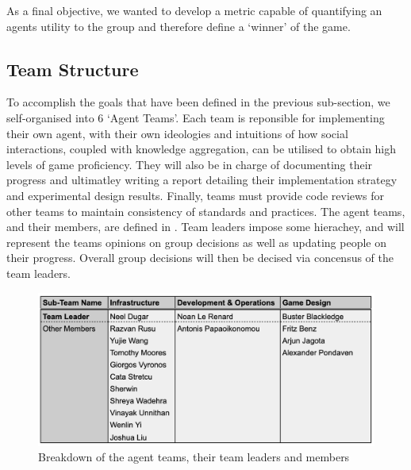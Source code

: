 As a final objective, we wanted to develop a metric capable of quantifying an agents utility to the group and therefore define a `winner' of the game. 



\subsection{Team Structure}\label{sec:team struct}

To accomplish the goals that have been defined in the previous sub-section, we self-organised into 6 `Agent Teams'. Each team is reponsible for implementing their own agent, with their own ideologies and intuitions of how social interactions, coupled with knowledge aggregation, can be utilised to obtain high levels of game proficiency. They will also be in charge of documenting their progress and ultimatley writing a report detailing their implementation strategy and experimental design results. Finally, teams must provide code reviews for other teams to maintain consistency of standards and practices. The agent teams, and their members, are defined in . Team leaders impose some hierachey, and will represent the teams opinions on group decisions as well as updating people on their progress. Overall group decisions will then be decised via concensus of the team leaders. 

\begin{figure}[htb]
    \centering
    \includegraphics{000_introduction/images/agentteams.png}
    \caption{Breakdown of the agent teams, their team leaders and members}
    \label{fig:agentteams}
\end{figure}
    
